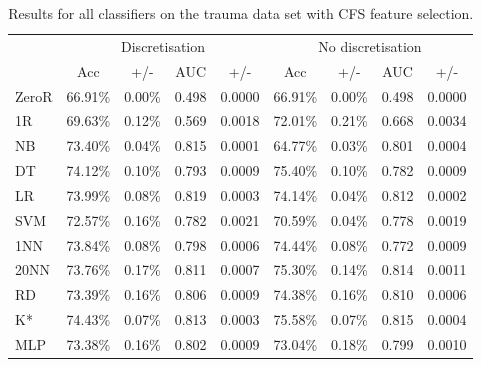 \begin{table}[htbp]
\caption{Results for all classifiers on the trauma data set with CFS feature selection.}
\begin{tabular}{|l|cccc|cccc|}
\hline
 & \multicolumn{ 4}{c|}{Discretisation} & \multicolumn{ 4}{c|}{No discretisation} \\ 
  & Acc & +/- & AUC & +/- & Acc & +/- & AUC & +/- \\ \hline
  ZeroR & 66.91\% & 0.00\% & 0.498 & 0.0000 & 66.91\% & 0.00\% & 0.498 & 0.0000 \\ 
  1R & 69.63\% & 0.12\% & 0.569 & 0.0018 & 72.01\% & 0.21\% & 0.668 & 0.0034 \\ 
  NB & 73.40\% & 0.04\% & 0.815 & 0.0001 & 64.77\% & 0.03\% & 0.801 & 0.0004 \\ 
  DT & 74.12\% & 0.10\% & 0.793 & 0.0009 & 75.40\% & 0.10\% & 0.782 & 0.0009 \\ 
  LR & 73.99\% & 0.08\% & 0.819 & 0.0003 & 74.14\% & 0.04\% & 0.812 & 0.0002 \\ 
  SVM & 72.57\% & 0.16\% & 0.782 & 0.0021 & 70.59\% & 0.04\% & 0.778 & 0.0019 \\ 
  1NN & 73.84\% & 0.08\% & 0.798 & 0.0006 & 74.44\% & 0.08\% & 0.772 & 0.0009 \\ 
  20NN & 73.76\% & 0.17\% & 0.811 & 0.0007 & 75.30\% & 0.14\% & 0.814 & 0.0011 \\ 
  RD & 73.39\% & 0.16\% & 0.806 & 0.0009 & 74.38\% & 0.16\% & 0.810 & 0.0006 \\ 
  K* & 74.43\% & 0.07\% & 0.813 & 0.0003 & 75.58\% & 0.07\% & 0.815 & 0.0004 \\ 
  MLP & 73.38\% & 0.16\% & 0.802 & 0.0009 & 73.04\% & 0.18\% & 0.799 & 0.0010 \\ \hline
  \end{tabular}
  \label{}
  \end{table}
